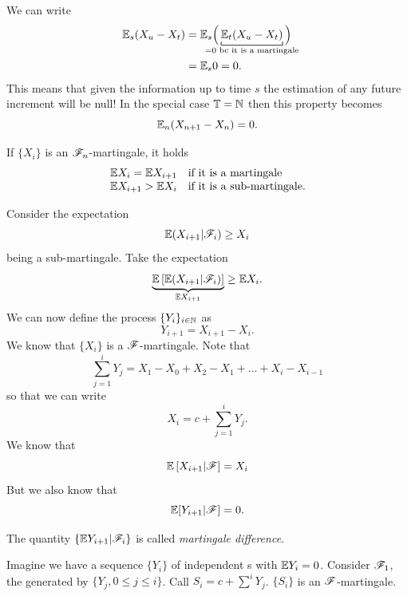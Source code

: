 \documentclass{report}
\begin{document}
We can write
\begin{align*}
	\ev_s(X_u-X_{t})&=\ev_s\Big(\underbracket[0.56pt]{\ev_t(X_u-X_t)}_{\mathclap{=0\text{ bc it is a martingale}}}\Big)\\
	&=\ev_s 0=0.
\end{align*}
This means that given the information up to time $s$ the estimation of any future increment will be null! In the special case $\mathbb{T}=\mathbb{N}$ then this property becomes
\[\mathbb{E}_n(X_{n+1}-X_n)=0.\]
\begin{proposition}
	If $\{X_i\}$ is an $\mathscr{F}_n$-martingale, it holds
	\[\begin{array}{l l}
		\mathbb{E} X_i=\mathbb{E} X_{i+1}&\text{if it is a martingale}\\
		\mathbb{E} X_{i+1}>\mathbb{E} X_i&\text{if it is a sub-martingale.}
	\end{array}\]
\end{proposition}
\begin{fancyproof}
	Consider the expectation
	\[\mathbb{E}(X_{i+1}|\mathscr{F}_i)\geq X_i\]
	being a sub-martingale. Take the expectation
	\[\underbrace{\mathbb{E}\left[\mathbb{E}(X_{i+1}|\mathscr{F}_i)\right]}_{\mathbb{E} X_{i+1}}\geq\mathbb{E} X_i.\]
	We can now define the process
	$\{Y_{i}\}_{i\in\mathbb{N}}$ as 
	\[Y_{i+1}=X_{i+1}-X_{i}.\]
	We know that $\{X_i\}$ is a $\mathscr{F}$-martingale. Note that
	\[\sum_{j=1}^{i} Y_j=X_1-X_0+X_2-X_1+\ldots+X_i-X_{i-1}\]
	so that we can write
	\[X_i=c+\sum_{j=1}^{i}Y_j.\]
	We know that 
	\[\mathbb{E}\left[X_{i+1}|\mathscr{F}\right]=X_i\]
	But we also know that 
	\begin{equation*}
	\mathbb{E}[Y_{i+1}|\mathscr{F}]=0.
	\end{equation*}
\end{fancyproof}
The quantity $\{\mathbb{E}{Y_{i+1}|\mathscr{F}_i}\}$ is called \emph{martingale difference}.
\begin{example}
	Imagine we have a sequence $\{Y_i\}$ of independent \rv s with $\mathbb{E} Y_i=0$.
	Consider $\mathscr{F}_1$, the \sa{} generated by $\{Y_j,0\leq j\leq i\}$. Call $S_i=c+\sum^{i}Y_{j}$. 
	$\{S_i\}$ is an $\mathscr{F}$-martingale.
\end{example}
\end{document}
